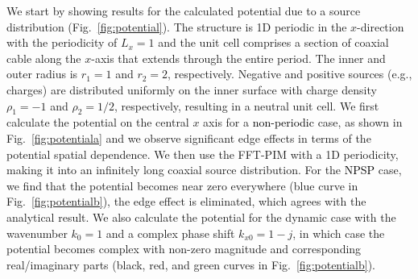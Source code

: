 \documentclass{article}
\begin{document}
We start by showing results for the calculated potential due to a source distribution (Fig.~\ref{fig:potential}). The structure is 1D periodic in the $x$-direction with the periodicity of $L_x = 1$ and the unit cell comprises a section of coaxial cable along the $x$-axis that extends through the entire period. The inner and outer radius is $r_1=1$ and $r_2=2$, respectively. Negative and positive sources (e.g., charges) are distributed uniformly on the inner surface with charge density $\rho_1=-1$ and $\rho_2 = 1/2$, respectively, resulting in a neutral unit cell. We first calculate the potential on the central $x$ axis for a \textcolor{black}{\textcolor{black}{non-periodic}} case, as shown in Fig.~\ref{fig:potentiala} and we observe significant edge effects in terms of the potential spatial dependence. We then use the FFT-PIM with a 1D periodicity, making it into an infinitely long coaxial source distribution. For the \textcolor{black}{NPSP} case, we find that the potential becomes near zero everywhere (blue curve in Fig.~\ref{fig:potentialb}), the edge effect is eliminated, which agrees with the analytical result. We also calculate the potential for the dynamic case with the wavenumber $k_0=1$ and a complex phase shift $k_{x0}=1-j$, in which case the potential becomes complex with non-zero magnitude and corresponding real/imaginary parts (black, red, and green curves in Fig.~\ref{fig:potentialb}).
\end{document}
